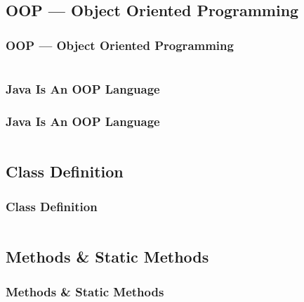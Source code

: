 \documentclass[en, 11pt, xcolor=dvipsnames]{beamer}
\begin{document}
\subsection{OOP --- Object Oriented Programming}
\begin{frame}[fragile]
	\frametitle{OOP --- Object Oriented Programming}

	\begin{columns}
		\begin{column}{0.98\textwidth}

		\end{column}
	\end{columns}

\end{frame}

\subsubsection{Java Is An OOP Language}
\begin{frame}[fragile]
	\frametitle{Java Is An OOP Language}

	\begin{columns}
		\begin{column}{0.98\textwidth}

		\end{column}
	\end{columns}

\end{frame}

\subsection{Class Definition}
\begin{frame}[fragile]
	\frametitle{Class Definition}

	\begin{columns}
		\begin{column}{0.98\textwidth}

		\end{column}
	\end{columns}

\end{frame}

\subsection{Methods \& Static Methods}
\begin{frame}[fragile]
	\frametitle{Methods \& Static Methods}

	\begin{columns}
		\begin{column}{0.98\textwidth}

		\end{column}
	\end{columns}

\end{frame}
\end{document}
